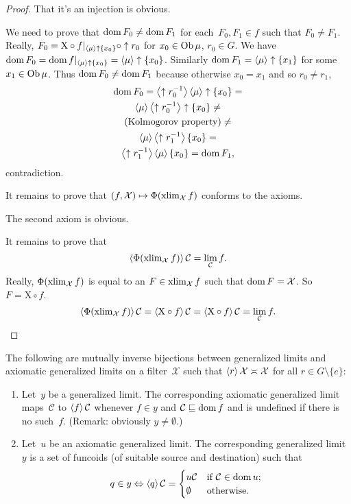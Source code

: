 \begin{proof}
That it's an injection is obvious.

We need to prove that $\operatorname{dom} F_0\ne\operatorname{dom} F_1$ for each~$F_0,F_1\in f$ such that $F_0\ne F_1$.
Really, $F_0=\mathrm{X}\circ f|_{\left\langle \mu\right\rangle\uparrow\{x_0\}}\circ\uparrow r_0$ for $x_0\in\operatorname{Ob}\mu$, $r_0\in G$.
We have $\operatorname{dom} F_0 = \operatorname{dom} f|_{\left\langle \mu\right\rangle\uparrow\{x_0\}}=\left\langle \mu\right\rangle\uparrow\{x_0\}$. Similarly $\operatorname{dom} F_1=\left\langle \mu\right\rangle\uparrow\{x_1\}$ for some $x_1\in\operatorname{Ob}\mu$.
Thus $\operatorname{dom} F_0\ne\operatorname{dom} F_1$ because otherwise $x_0=x_1$ and so $r_0\ne r_1$,
\begin{multline*}
\operatorname{dom} F_0=\left\langle \uparrow r_0^{-1}\right\rangle\left\langle \mu\right\rangle\uparrow\{x_0\}=\\\left\langle \mu\right\rangle\left\langle \uparrow r_0^{-1}\right\rangle\uparrow\{x_0\}\ne\\\text{(Kolmogorov property)}\ne\\\left\langle \mu\right\rangle\left\langle \uparrow r_1^{-1}\right\rangle\{x_0\}=\\\left\langle \uparrow r_1^{-1}\right\rangle\left\langle \mu\right\rangle\{x_0\}=\operatorname{dom} F_1,
\end{multline*}
contradiction.

It remains to prove that $(f,\mathcal{X})\mapsto\Phi(\operatorname{xlim}_{\mathcal{X}} f)$ conforms to the axioms.

The second axiom is obvious.

It remains to prove that
\[ \left\langle \Phi(\operatorname{xlim}_{\mathcal{X}} f)\right\rangle\mathcal{C} = \lim_{\mathcal{C}}f. \]
Really, $\Phi(\operatorname{xlim}_{\mathcal{X}} f)$ is equal to an $F\in\operatorname{xlim}_{\mathcal{X}} f$ such that $\operatorname{dom} F=\mathcal{X}$.
So $F=\mathrm{X}\circ f$.
\[ \left\langle \Phi(\operatorname{xlim}_{\mathcal{X}} f)\right\rangle\mathcal{C} =
\left\langle \mathrm{X}\circ f\right\rangle\mathcal{C} =
\left\langle \mathrm{X}\circ f\right\rangle\mathcal{C} =
\lim_{\mathcal{C}}f. \]
\end{proof}

\begin{thm}
The following are mutually inverse bijections between
generalized limits and axiomatic generalized limits on a filter~$\mathcal{X}$ such that $\left\langle r\right\rangle\mathcal{X}\asymp\mathcal{X}$ for all $r\in G\setminus\{e\}$:
\begin{enumerate}
\item\label{corr-gl-agl} Let~$y$ be a generalized limit. The corresponding axiomatic
generalized limit maps~$\mathcal{C}$ to $\left\langle f\right\rangle\mathcal{C}$ whenever $f\in y$ and $\mathcal{C}\sqsubseteq\operatorname{dom} f$ and is undefined if there is no such~$f$. (Remark: obviously $y\ne\emptyset$.)
\item\label{corr-agl-gl} Let~$u$ be an axiomatic generalized limit. The corresponding generalized limit~$y$ is a set of funcoids (of suitable source and destination) such that
\[q\in y \Leftrightarrow \left\langle q\right\rangle\mathcal{C}=\begin{cases}
u\mathcal{C}&\text{if }\mathcal{C}\in\operatorname{dom} u;\\
\emptyset&\text{otherwise}.
\end{cases}
\]
\end{enumerate}
\end{thm}

